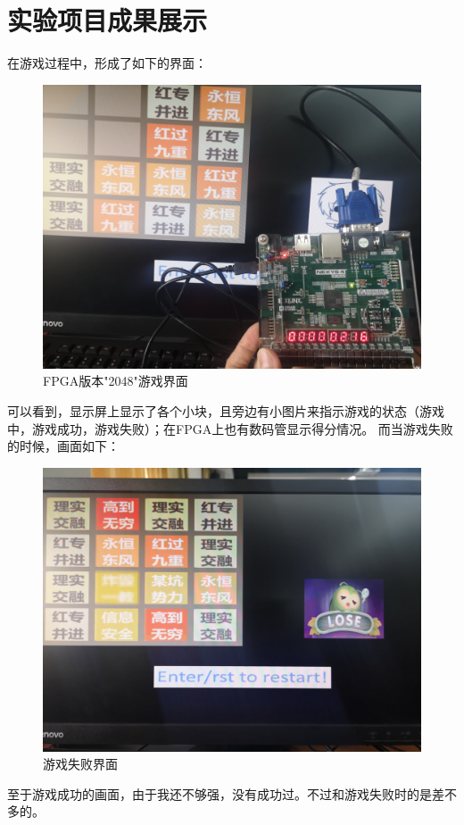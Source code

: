 \documentclass[UTF8]{article}
\begin{document}
	\section{实验项目成果展示}
	在游戏过程中，形成了如下的界面：\par
	\begin{figure}[H]
		\centering
		\includegraphics[scale=0.07]{gaming.jpg}
		\caption{FPGA版本"2048"游戏界面}
		\label{gaming}
	\end{figure}\par
	可以看到，显示屏上显示了各个小块，且旁边有小图片来指示游戏的状态（游戏中，游戏成功，游戏失败）；在FPGA上也有数码管显示得分情况。
	而当游戏失败的时候，画面如下：\par
	\begin{figure}[H]
		\centering
		\includegraphics[scale=0.07]{fail.jpg}
		\caption{游戏失败界面}
		\label{fail}
	\end{figure}\par
	至于游戏成功的画面，由于我还不够强，没有成功过。不过和游戏失败时的是差不多的。\par
\end{document}
